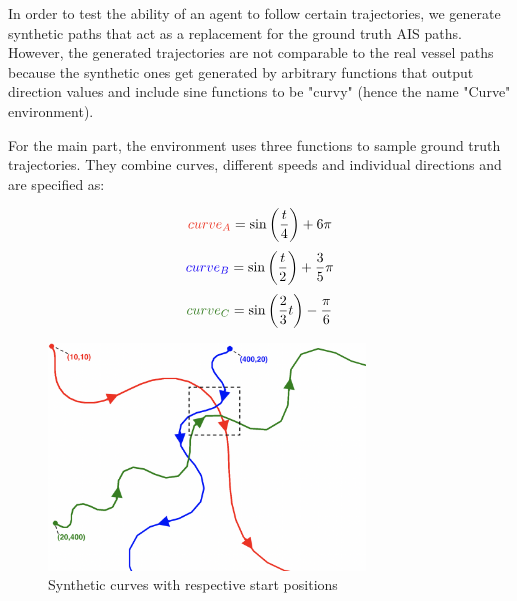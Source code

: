 In order to test the ability of an agent to follow certain trajectories, we generate synthetic paths that act as a replacement for the ground truth AIS paths. However, the generated trajectories are not comparable to the real vessel paths because the synthetic ones get generated by arbitrary functions that output direction values and include sine functions to be "curvy" (hence the name "Curve" environment).
\par
For the main part, the environment uses three functions to sample ground truth trajectories. They combine curves, different speeds and individual directions and are specified as:

\begin{equation}\label{eq:curve_A}
\textcolor[RGB]{235,52,35}{curve_A} = \sin \left( \frac{t}{4} \right) + 6\pi
\end{equation}
\begin{equation}
\textcolor[RGB]{20,1,244}{curve_B} = \sin \left( \frac{t}{2} \right)+ \frac{3}{5}\pi
\end{equation}
\begin{equation}
\textcolor[RGB]{54,125,34}{curve_C} = \sin \left( \frac{2}{3} t \right) - \frac{\pi}{6}
\end{equation}

\begin{figure}[H]
    \centering
    \includegraphics[width=0.75\textwidth]{images/curves.png}
    \caption{Synthetic curves with respective start positions}
    \label{fig:syntheticCurves}
\end{figure}


